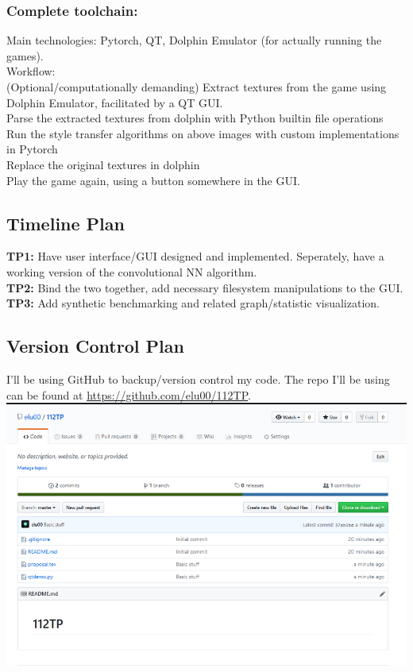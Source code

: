 \documentclass[12pt]{article}
\begin{document}
    \subsubsection{Complete toolchain:}
    Main technologies: Pytorch, QT, Dolphin Emulator (for actually running the games). \\
    Workflow: \\
    (Optional/computationally demanding) Extract textures from the game using Dolphin Emulator, facilitated by a QT GUI. \\
    Parse the extracted textures from dolphin with Python builtin file operations \\
    Run the style transfer algorithms on above images with custom implementations in Pytorch \\
    Replace the original textures in dolphin \\
    Play the game again, using a button somewhere in the GUI. \\

\subsection{Timeline Plan}
    \textbf{TP1:} Have user interface/GUI designed and implemented. Seperately, have a working version of the convolutional NN algorithm.\\
    \textbf{TP2:} Bind the two together, add necessary filesystem manipulations to the GUI.\\ 
    \textbf{TP3:} Add synthetic benchmarking and related graph/statistic visualization.\\
\subsection{Version Control Plan}
    I'll be using GitHub to backup/version control my code. 
    The repo I'll be using can be found at \href{https://github.com/elu00/112TP}{https://github.com/elu00/112TP}. \\
    \includegraphics[scale=0.8]{screenshot.png}
\end{document}
